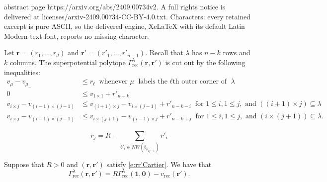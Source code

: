 \documentclass[10pt,a4paper]{amsart}
\newcommand{\muminus}{\mu_{-}}
\newcommand{\rect}{\mathrm{rec}}
\begin{document}
abstract page https://arxiv.org/abs/2409.00734v2. A full rights notice is delivered at licenses/arxiv-2409.00734-CC-BY-4.0.txt. Characters: every retained excerpt is pure ASCII, so the delivered engine, XeLaTeX with its default Latin Modern text font, reports no missing character.
\begin{lemma}\label{l:rectangles}
	Let  $\mathbf{r}=(r_1,\dots,r_d)$ and $\mathbf{r'}=(r'_1,\dots,r'_{n-1})$. Recall that $\lambda$ has $n-k$ rows and $k$ columns. 
	The superpotential polytope $\Gamma^{\lambda}_{\rect}(\mathbf{r},\mathbf{r'})$ 
is cut out by the following inequalities:
	\begin{align}
		v_{\mu} - v_{\muminus} & \leq r_\ell\ \text{ whenever }\mu 
		\text{ labels the $\ell$th outer corner of }\lambda  \label{eq:1gen}\\
		0 & \leq v_{1 \times 1}+r'_{n-k} \label{eq:2gen} \\
		v_{i\times j} - v_{(i-1)\times (j-1)} &\leq
		v_{(i+1) \times j}  - v_{i\times (j-1)}+r'_{n-k-i}
\ \text{ for }1 \leq i, 
		1\leq j, \text{ and } ((i+1) \times j) \subseteq \lambda \label{eq:3gen}\\
v_{i\times j}-v_{(i-1)\times (j-1)} &\leq
		v_{i\times (j+1)}  - v_{(i-1)\times j} + r'_{n-k+j}
\ \text{ for } 1\leq i,
		1 \leq j, \text{ and } (i \times (j+1)) \subseteq \lambda. \label{eq:4gen}
	\end{align}
\end{lemma}

\begin{equation}\label{e:rr'Cartier}
r_j=R-\sum_{b'_{i}\in NW(b_{\rho_{2j-1}})}r'_i
\end{equation}

\begin{proposition}\label{p:GammaShiftRect} Suppose that $R>0$ and $(\mathbf r,\mathbf r')$ satisfy \eqref{e:rr'Cartier}. We have that
\[
\Gamma^\lambda_{\rect}(\mathbf r,\mathbf r')=R\Gamma^\lambda_\rect(\mathbf 1,\mathbf 0)-v_\rect(\mathbf r').
\]
\end{proposition}
\end{document}
